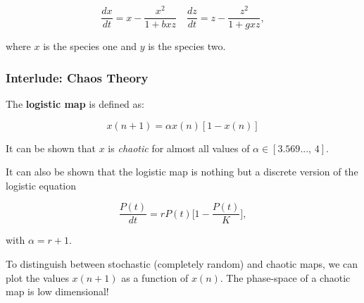 \documentclass[a4paper]{extarticle}
\begin{document}
\[
    \frac{dx}{dt} = x - \frac{x^2}{1 + bxz} \quad \frac{dz}{dt} = z - \frac{z^2}{1 + gxz},
\]

where $x$ is the species one and $y$ is the species two.

\subsubsection{Interlude: Chaos Theory}

The \textbf{logistic map} is defined as:

\[
    x(n + 1) = \alpha x(n) [1 - x(n)]
\]

It can be shown that $x$ is \textit{chaotic} for almost all values of $\alpha \in [3.569..., \, 4]$.

It can also be shown that the logistic map is nothing but a discrete version of the logistic equation

\[
    \frac{P(t)}{dt} = rP(t) \big[1 - \frac{P(t)}{K} \big],
\]

with $\alpha = r + 1$.

To distinguish between stochastic (completely random) and chaotic maps, we can plot the values $x(n + 1)$ as a function of $x(n)$. The phase-space of a chaotic map is low dimensional!
\end{document}
